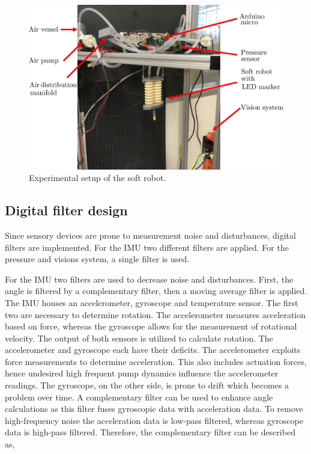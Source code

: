 \begin{figure}[H]
    \centering
    \includegraphics[width = \textwidth]{Figures/Chapter5/expsetup.png}
    \caption{Experimental setup of the soft robot.}
    \label{fig5:setup}
\end{figure}




\subsection*{Digital filter design}

Since sensory devices are prone to measurement noise and disturbances, digital filters are implemented. For the IMU two different filters are applied. For the pressure and visions system, a single filter is used. 

For the IMU two filters are used to decrease noise and disturbances. First, the angle is filtered by a complementary filter, then a moving average filter is applied. The IMU houses an accelerometer, gyroscope and temperature sensor. The first two are necessary to determine rotation. The accelerometer measures acceleration based on force, whereas the gyroscope allows for the measurement of rotational velocity. The output of both sensors is utilized to calculate rotation. The accelerometer and gyroscope each have their deficits. The accelerometer exploits force measurements to determine acceleration. This also includes actuation forces, hence undesired high frequent pump dynamics influence the accelerometer readings. The gyroscope, on the other side, is prone to drift which becomes a problem over time. A complementary filter can be used to enhance angle calculations as this filter fuses gyroscopic data with acceleration data. To remove high-frequency noise the acceleration data is low-pass filtered, whereas gyroscope data is high-pass filtered. Therefore, the complementary filter can be described as, 

